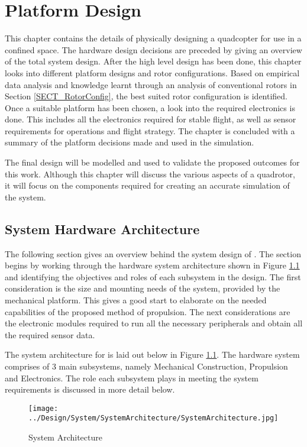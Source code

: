 \chapter{Platform Design}
This chapter contains the details of physically designing a quadcopter for use in a confined space. The hardware design decisions are preceded by giving an overview of the total system design. After the high level design has been done, this chapter looks into different platform designs and rotor configurations. Based on empirical data analysis and knowledge learnt through an analysis of conventional rotors in Section \ref{SECT_RotorConfig}, the best suited rotor configuration is identified. Once a suitable platform has been chosen, a look into the required electronics is done. This includes all the electronics required for stable flight, as well as sensor requirements for operations and flight strategy. The chapter is concluded with a summary of the platform decisions made and used in the simulation.

The final design will be modelled and used to validate the proposed outcomes for this work. Although this chapter will discuss the various aspects of a quadrotor, it will focus on the components required for creating an accurate simulation of the system.

	\section{System Hardware Architecture}
	The following section gives an overview behind the system design of \projectName. The section begins by working through the hardware system architecture shown in Figure \ref{IM_SystemArchitecture} and identifying the objectives and roles of each subsystem in the design. The first consideration is the size and mounting needs of the system, provided by the mechanical platform. This gives a good start to elaborate on the needed capabilities of the proposed method of propulsion. The next considerations are the electronic modules required to run all the necessary peripherals and obtain all the required sensor data.
	
	The system architecture for \projectName is laid out below in Figure \ref{IM_SystemArchitecture}. The hardware system comprises of 3 main subsystems, namely Mechanical Construction, Propulsion and Electronics. The role each subsystem plays in meeting the system requirements is discussed in more detail below.
	
	\begin{figure}[H]
		\centering
		\texttt{[image: ../Design/System/SystemArchitecture/SystemArchitecture.jpg]}
		\caption{System Architecture}
		\label{IM_SystemArchitecture}
	\end{figure}

